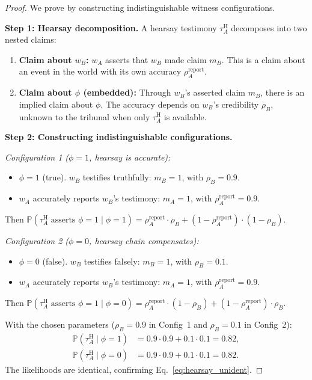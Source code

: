 \documentclass[11pt,a4paper]{article}
\theoremstyle{definition}
\newcommand{\Pbb}{\mathbb{P}}
\newcommand{\fact}{\phi}                        %
\newcommand{\hear}{\mathrm{H}}                  %
\begin{document}
\begin{proof}
We prove by constructing indistinguishable witness configurations.

\medskip\noindent\textbf{Step 1: Hearsay decomposition.}
A hearsay testimony $\tau_A^{\hear}$ decomposes into two nested claims:
\begin{enumerate}
    \item \textbf{Claim about $w_B$:} $w_A$ asserts that $w_B$ made claim $m_B$. This is a claim about an event in the world with its own accuracy $\rho_A^{\mathrm{report}}$.
    \item \textbf{Claim about $\fact$ (embedded):} Through $w_B$'s asserted claim $m_B$, there is an implied claim about $\fact$. The accuracy depends on $w_B$'s credibility $\rho_B$, unknown to the tribunal when only $\tau_A^{\hear}$ is available.
\end{enumerate}

\medskip\noindent\textbf{Step 2: Constructing indistinguishable configurations.}

\textit{Configuration 1 ($\fact = 1$, hearsay is accurate):}
\begin{itemize}
    \item $\fact = 1$ (true). $w_B$ testifies truthfully: $m_B = 1$, with $\rho_B = 0.9$.
    \item $w_A$ accurately reports $w_B$'s testimony: $m_A = 1$, with $\rho_A^{\mathrm{report}} = 0.9$.
\end{itemize}
Then $\Pbb(\tau_A^{\hear} \text{ asserts } \fact=1 \mid \fact = 1) = \rho_A^{\mathrm{report}} \cdot \rho_B + (1 - \rho_A^{\mathrm{report}}) \cdot (1 - \rho_B)$.

\textit{Configuration 2 ($\fact = 0$, hearsay chain compensates):}
\begin{itemize}
    \item $\fact = 0$ (false). $w_B$ testifies falsely: $m_B = 1$, with $\rho_B = 0.1$.
    \item $w_A$ accurately reports $w_B$'s testimony: $m_A = 1$, with $\rho_A^{\mathrm{report}} = 0.9$.
\end{itemize}
Then $\Pbb(\tau_A^{\hear} \text{ asserts } \fact=1 \mid \fact = 0) = \rho_A^{\mathrm{report}} \cdot (1 - \rho_B) + (1 - \rho_A^{\mathrm{report}}) \cdot \rho_B$.

With the chosen parameters ($\rho_B = 0.9$ in Config~1 and $\rho_B = 0.1$ in Config~2):
\begin{align}
    \Pbb(\tau_A^{\hear} \mid \fact = 1) &= 0.9 \cdot 0.9 + 0.1 \cdot 0.1 = 0.82, \\
    \Pbb(\tau_A^{\hear} \mid \fact = 0) &= 0.9 \cdot 0.9 + 0.1 \cdot 0.1 = 0.82.
\end{align}
The likelihoods are identical, confirming Eq.~\eqref{eq:hearsay_unident}.


\end{proof}
\end{document}
